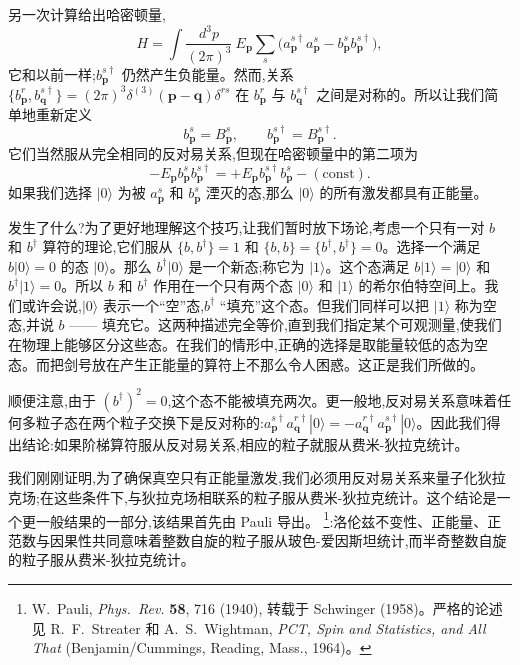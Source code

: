 另一次计算给出哈密顿量,
\begin{equation}
  H = \int \frac{d^3p}{(2\pi)^3}\ E_{\mathbf{p}}
    \sum_s \bigl( a_{\mathbf{p}}^{s\dagger}a_{\mathbf{p}}^s
      - b_{\mathbf{p}}^s b_{\mathbf{p}}^{s\dagger} \bigr),
\end{equation}
它和以前一样;$b_{\mathbf{p}}^{s\dagger}$ 仍然产生负能量。然而,关系
$\{b_{\mathbf{p}}^r, b_{\mathbf{q}}^{s\dagger}\}
= (2\pi)^3\delta^{(3)}(\mathbf{p}-\mathbf{q})\delta^{rs}$ 在 $b_{\mathbf{p}}^r$ 与 $b_{\mathbf{q}}^{s\dagger}$ 之间是对称的。所以让我们简单地重新定义
\begin{equation}
  b_{\mathbf{p}}^s = B_{\mathbf{p}}^s,\qquad
  b_{\mathbf{p}}^{s\dagger} = B_{\mathbf{p}}^{s\dagger} .
  \label{eq:3.100}
\end{equation}
它们当然服从完全相同的反对易关系,但现在哈密顿量中的第二项为
\begin{equation}
  -E_{\mathbf{p}}b_{\mathbf{p}}^s b_{\mathbf{p}}^{s\dagger}
    = +E_{\mathbf{p}}b_{\mathbf{p}}^{s\dagger}b_{\mathbf{p}}^s
      - (\text{const}).
\end{equation}
如果我们选择 $|0\rangle$ 为被 $a_{\mathbf{p}}^s$ 和 $b_{\mathbf{p}}^s$ 湮灭的态,那么 $|0\rangle$ 的所有激发都具有正能量。

发生了什么?为了更好地理解这个技巧,让我们暂时放下场论,考虑一个只有一对 $b$ 和 $b^\dagger$ 算符的理论,它们服从 $\{b,b^\dagger\} = 1$ 和 $\{b,b\} = \{b^\dagger,b^\dagger\} = 0$。选择一个满足 $b|0\rangle = 0$ 的态 $|0\rangle$。那么 $b^\dagger|0\rangle$ 是一个新态;称它为 $|1\rangle$。这个态满足 $b|1\rangle = |0\rangle$ 和 $b^\dagger|1\rangle = 0$。所以 $b$ 和 $b^\dagger$ 作用在一个只有两个态 $|0\rangle$ 和 $|1\rangle$ 的希尔伯特空间上。我们或许会说,$|0\rangle$ 表示一个``空''态,$b^\dagger$ ``填充''这个态。但我们同样可以把 $|1\rangle$ 称为空态,并说 $b$ —— 填充它。这两种描述完全等价,直到我们指定某个可观测量,使我们在物理上能够区分这些态。在我们的情形中,正确的选择是取能量较低的态为空态。而把剑号放在产生正能量的算符上不那么令人困惑。这正是我们所做的。

顺便注意,由于 $(b^\dagger)^2 = 0$,这个态不能被填充两次。更一般地,反对易关系意味着任何多粒子态在两个粒子交换下是反对称的:$a_{\mathbf{p}}^{s\dagger}a_{\mathbf{q}}^{r\dagger}|0\rangle =
-a_{\mathbf{q}}^{r\dagger}a_{\mathbf{p}}^{s\dagger}|0\rangle$。因此我们得出结论:如果阶梯算符服从反对易关系,相应的粒子就服从费米-狄拉克统计。

我们刚刚证明,为了确保真空只有正能量激发,我们必须用反对易关系来量子化狄拉克场;在这些条件下,与狄拉克场相联系的粒子服从费米-狄拉克统计。这个结论是一个更一般结果的一部分,该结果首先由 Pauli 导出。%
\footnote{W.~Pauli, \emph{Phys.\ Rev.} \textbf{58}, 716 (1940), 转载于 Schwinger (1958)。严格的论述见 R.~F.~Streater 和 A.~S.~Wightman, \emph{PCT, Spin and Statistics, and All That} (Benjamin/Cummings, Reading, Mass., 1964)。}:洛伦兹不变性、正能量、正范数与因果性共同意味着整数自旋的粒子服从玻色-爱因斯坦统计,而半奇整数自旋的粒子服从费米-狄拉克统计。


